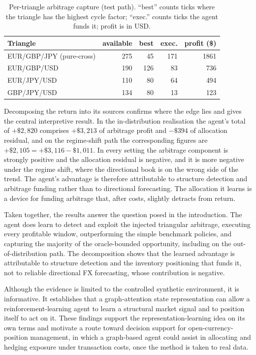\documentclass[12pt,a4paper]{article}
\begin{document}
\begin{table}[t]
\centering
\caption{Per-triangle arbitrage capture (test path). ``best'' counts ticks where the triangle
has the highest cycle factor; ``exec.'' counts ticks the agent funds it; profit is in USD.}
\label{tab:tri}
\begin{tabular}{lrrrr}
\toprule
Triangle & available & best & exec. & profit (\$) \\
\midrule
EUR/GBP/JPY (pure-cross) & 275 & 45  & 171 & 1861 \\
EUR/GBP/USD              & 190 & 126 & 83  & 736 \\
EUR/JPY/USD              & 110 & 80  & 64  & 494 \\
GBP/JPY/USD              & 134 & 80  & 13  & 123 \\
\bottomrule
\end{tabular}
\end{table}

Decomposing the return into its sources confirms where the edge lies and gives the central
interpretive result. In the in-distribution
realisation the agent's total of $+\$2{,}820$ comprises $+\$3{,}213$ of arbitrage profit and
$-\$394$ of allocation residual, and on the regime-shift path the corresponding figures are
$+\$2{,}105 = +\$3{,}116 - \$1{,}011$. In every setting the arbitrage component is strongly
positive and the allocation residual is negative, and it is more negative under the regime
shift, where the directional book is on the wrong side of the trend. The agent's advantage is
therefore attributable to structure detection and arbitrage funding rather than to directional
forecasting. The allocation it learns is a device for funding arbitrage that, after costs,
slightly detracts from return.

Taken together, the results answer the question posed in the introduction. The agent does
learn to detect and exploit the injected triangular arbitrage, executing every profitable
window, outperforming the simple benchmark policies, and capturing the majority of the
oracle-bounded opportunity, including on the out-of-distribution path. The decomposition shows
that the learned advantage is attributable to structure detection and the inventory positioning
that funds it, not to reliable directional FX forecasting, whose contribution is negative.

Although the evidence is limited to the controlled synthetic environment, it is informative. It
establishes that a graph-attention state representation can allow a reinforcement-learning agent
to learn a structural market signal and to position itself to act on it. These findings support
the representation-learning idea on its own terms and motivate
a route toward decision support for open-currency-position management, in which a graph-based
agent could assist in allocating and hedging exposure under transaction costs, once the method
is taken to real data.
\end{document}
